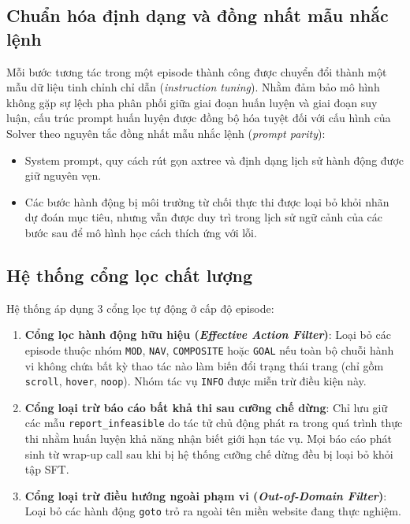 \subsection{Chuẩn hóa định dạng và đồng nhất mẫu nhắc lệnh}

Mỗi bước tương tác trong một episode thành công được chuyển đổi thành một mẫu dữ liệu tinh chỉnh chỉ dẫn (\textit{instruction tuning}). Nhằm đảm bảo mô hình không gặp sự lệch pha phân phối giữa giai đoạn huấn luyện và giai đoạn suy luận, cấu trúc prompt huấn luyện được đồng bộ hóa tuyệt đối với cấu hình của Solver theo nguyên tắc đồng nhất mẫu nhắc lệnh (\textit{prompt parity}):
\begin{itemize}
  \item System prompt, quy cách rút gọn axtree và định dạng lịch sử hành động được giữ nguyên vẹn.
  \item Các bước hành động bị môi trường từ chối thực thi được loại bỏ khỏi nhãn dự đoán mục tiêu, nhưng vẫn được duy trì trong lịch sử ngữ cảnh của các bước sau để mô hình học cách thích ứng với lỗi.
\end{itemize}

\subsection{Hệ thống cổng lọc chất lượng}

Hệ thống áp dụng 3 cổng lọc tự động ở cấp độ episode:
\begin{enumerate}
  \item \textbf{Cổng lọc hành động hữu hiệu (\textit{Effective Action Filter})}: Loại bỏ các episode thuộc nhóm \texttt{MOD}, \texttt{NAV}, \texttt{COMPOSITE} hoặc \texttt{GOAL} nếu toàn bộ chuỗi hành vi không chứa bất kỳ thao tác nào làm biến đổi trạng thái trang (chỉ gồm \texttt{scroll}, \texttt{hover}, \texttt{noop}). Nhóm tác vụ \texttt{INFO} được miễn trừ điều kiện này.
  \item \textbf{Cổng loại trừ báo cáo bất khả thi sau cưỡng chế dừng}: Chỉ lưu giữ các mẫu \texttt{report\_infeasible} do tác tử chủ động phát ra trong quá trình thực thi nhằm huấn luyện khả năng nhận biết giới hạn tác vụ. Mọi báo cáo phát sinh từ wrap-up call sau khi bị hệ thống cưỡng chế dừng đều bị loại bỏ khỏi tập SFT.
  \item \textbf{Cổng loại trừ điều hướng ngoài phạm vi (\textit{Out-of-Domain Filter})}: Loại bỏ các hành động \texttt{goto} trỏ ra ngoài tên miền website đang thực nghiệm.
\end{enumerate}

